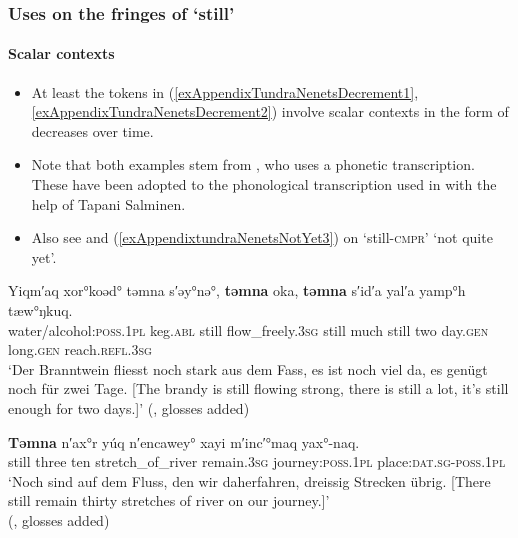 \subsubsection{Uses on the fringes of \lq{}still\rq{}}
\largerpage
\paragraph{Scalar contexts}\label{appendixTundraNenetsScalar}
\begin{itemize}
	\item At least the tokens in (\ref{exAppendixTundraNenetsDecrement1}, \ref{exAppendixTundraNenetsDecrement2}) involve scalar contexts in the form of decreases over time.
	\item Note that both examples stem from \textcite{Lehtisalo1956}, who uses a phonetic transcription. These have been adopted to the phonological transcription used in \textcite{Nikolaeva2014} with the help of Tapani Salminen.
	\item Also see  and (\ref{exAppendixtundraNenetsNotYet3}) on \lq still-\textsc{cmpr}' \lq not quite yet'.
\end{itemize}

\begin{exe}
	\ex\label{exAppendixTundraNenetsDecrement1}
	\gll Yiqm′aq xor°koəd° təmna s′əy°nə°, \textbf{təmna} oka, \textbf{təmna} s′id′a yal′a yamp°h tæw°ŋkuq.\\
	water/alcohol:\textsc{poss}.1\textsc{pl} keg.\textsc{abl} still flow\_freely.3\textsc{sg} still much still two day.\textsc{gen} long.\textsc{gen} reach.\textsc{refl}.3\textsc{sg}\\
	\glt \lq Der Branntwein fliesst noch stark aus dem Fass, es ist noch viel da, es genügt noch für zwei Tage. [The brandy is still flowing strong, there is still a lot, it’s still enough for two days.]\rq{ }(\cite[435]{Lehtisalo1956}, glosses added)

	\ex\label{exAppendixTundraNenetsDecrement2}
	\gll \textbf{Təmna} n′ax°r yúq n′encawey° xayi m′inc′°maq yax°-naq.\\
	still three ten stretch\_of\_river remain.3\textsc{sg} journey:\textsc{poss}.1\textsc{pl} place:\textsc{dat}.\textsc{sg}-\textsc{poss}.1\textsc{pl}\\
	\glt \lq{}Noch sind auf dem Fluss, den wir daherfahren, dreissig Strecken übrig. [There still remain thirty stretches of river on our journey.]\rq
	\\(\cite[319]{Lehtisalo1956}, glosses added)
\end{exe}	
	
